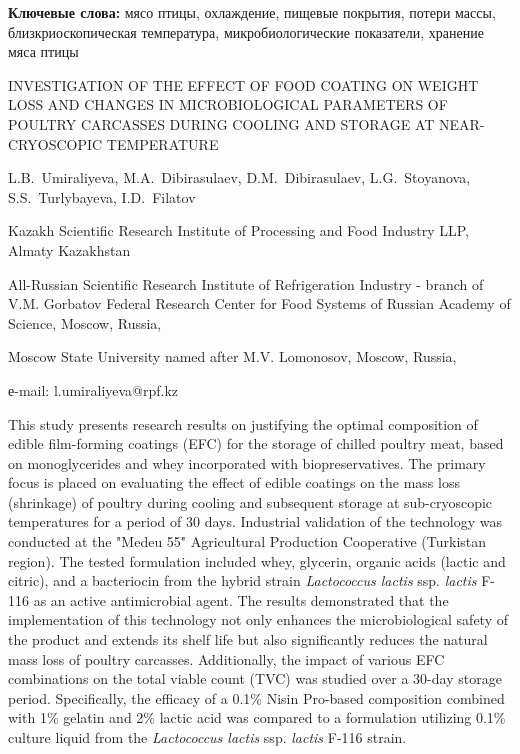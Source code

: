 {\bfseries Ключевые слова:} мясо птицы, охлаждение, пищевые покрытия,
потери массы, близкриоскопическая температура, микробиологические
показатели, хранение мяса птицы

\begin{header}
INVESTIGATION OF THE EFFECT OF FOOD COATING ON WEIGHT LOSS AND CHANGES IN MICROBIOLOGICAL PARAMETERS OF POULTRY CARCASSES DURING COOLING AND STORAGE AT NEAR-CRYOSCOPIC TEMPERATURE

L.B.~Umiraliyeva\envelope,
M.A.~Dibirasulaev,
D.M.~Dibirasulaev,
L.G.~Stoyanova,
S.S.~Turlybayeva,
I.D.~Filatov
\end{header}

\begin{affil}
Kazakh Scientific Research Institute of Processing and Food Industry LLP, Almaty Kazakhstan

All-Russian Scientific Research Institute of Refrigeration Industry - branch of V.M. Gorbatov Federal Research Center for Food Systems of Russian Academy of Science, Moscow, Russia,

Moscow State University named after M.V. Lomonosov, Moscow, Russia,

е-mail: l.umiraliyeva@rpf.kz
\end{affil}

This study presents research results on justifying the optimal
composition of edible film-forming coat\-ings (EFC) for the storage of
chilled poultry meat, based on monoglycerides and whey incorporated with
biopreservatives. The primary focus is placed on evaluating the effect
of edible coatings on the mass loss (shrinkage) of poultry during
cooling and subsequent storage at sub-cryoscopic temperatures for a
period of 30 days. Industrial validation of the technology was conducted
at the "Medeu 55" Agricultural Production Cooperative (Turkistan
region). The tested formulation included whey, glycerin, organic acids
(lactic and citric), and a bacteriocin from the hybrid strain
\emph{Lactococcus lactis} ssp. \emph{lactis} F-116 as an active
antimicrobial agent. The results demonstrated that the implementation of
this technology not only enhances the microbiological safety of the
product and extends its shelf life but also significantly reduces the
natural mass loss of poultry carcasses. Additionally, the impact of
various EFC combinations on the total viable count (TVC) was studied
over a 30-day storage period. Specifically, the efficacy of a 0.1\%
Nisin Pro-based composition combined with 1\% gelatin and 2\% lactic
acid was compared to a formulation utilizing 0.1\% culture liquid from
the \emph{Lactococcus lactis} ssp. \emph{lactis} F-116 strain.

